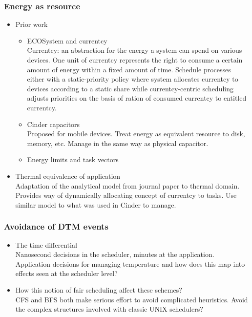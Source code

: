 \documentclass[11pt]{article}
\begin{document}
\subsubsection{Energy as resource}
\label{sec-1_4_2}
\begin{itemize}

\item Prior work
\label{sec-1_4_2_1}%
\begin{itemize}

\item ECOSystem and currentcy \cite{Zeng2002}\\
\label{sec-1_4_2_1_1}%
Currentcy: an abstraction for the energy a system can spend on various
devices.  One unit of currentcy represents the right to consume a
certain amount of energy within a fixed amount of time.   Schedule
processes either with a static-priority policy where system allocates
currentcy to devices according to a static share while currentcy-centric
scheduling adjusts priorities on the basis of ration of consumed
currentcy to entitled currentcy.

\item Cinder capacitors \cite{Rumble2009}\\
\label{sec-1_4_2_1_2}%
Proposed for mobile devices.  Treat energy as equivalent resource to
disk, memory, etc.   Manage in the same way as physical capacitor.

\item Energy limits and task vectors \cite{Bellosa2003}\cite{Klee2008}\cite{Merkel2008}\\
\label{sec-1_4_2_1_3}%
\end{itemize} %

\item Thermal equivalence of application\\
\label{sec-1_4_2_2}%
Adaptation of the analytical model from journal paper to thermal
domain.  Provides way of dynamically allocating concept of currentcy to
tasks. Use similar model to what was used in Cinder to manage.
\end{itemize} %
\subsubsection{Avoidance of DTM events}
\label{sec-1_4_3}
\begin{itemize}

\item The time differential\\
\label{sec-1_4_3_1}%
Nanosecond decisions in the scheduler, minutes at the application.
Application decisions for managing temperature and how does this map
into effects seen at the scheduler level?

\item How this notion of fair scheduling affect these schemes?\\
\label{sec-1_4_3_2}%
CFS and BFS both make serious effort to avoid complicated heuristics.
Avoid the complex structures involved with classic UNIX schedulers?
\end{itemize} %
\end{document}
